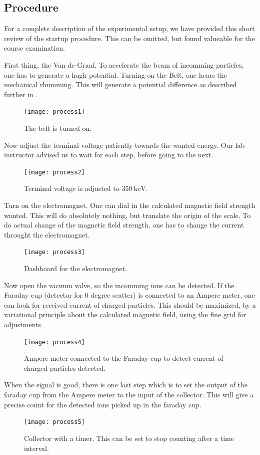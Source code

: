 \clearpage
\subsection{Procedure}
For a complete description of the experimental setup, we have provided this
short review of the startup procedure. This can be omitted, but found valueable
for the course examination.

First thing, the Van-de-Graaf. To accelerate the beam of incomming particles,
one has to generate a hugh potential. Turning on the Belt, one hears the
mechanical rhumming. This will generate a potential difference as described
further in \cite[p. 565]{krane}.
\begin{figure}[h!]
\centering
\texttt{[image: process1]}
\caption{The belt is turned on.}
\label{fig_process1}
\end{figure}

Now adjust the terminal voltage patiently towards the wanted energy. Our lab
instructor advised us to wait for each step, before going to the next.
\begin{figure}[h!]
\centering
\texttt{[image: process2]}
\caption{Terminal voltage is adjusted to $\SI{350}{\kilo\electronvolt}$.}
\label{fig_process2}
\end{figure}

Turn on the electromagnet. One can dial in the calculated magnetic field
strength wanted. This will do absolutely nothing, but translate the origin of
the scale. To do actual change of the magnetic field strength, one has to
change the current throught the electromagnet.
\begin{figure}[h!]
\centering
\texttt{[image: process3]}
\caption{Dashboard for the electromagnet.}
\label{fig_process3}
\end{figure}

Now open the vacuum valve, so the incomming ions can be detected.
If the Faraday cup (detector for $0$ degree scatter) is connected to an Ampere
meter, one can look for received current of charged particles. This should be
maximized, by a variational principle about the calculated magnetic field,
using the fine grid for adjustments.

\begin{figure}[h!]
\centering
\texttt{[image: process4]}
\caption{Ampere meter connected to the Faraday cup to detect current of charged
particles detected.}
\label{fig_process4}
\end{figure}
When the signal is good, there is one last step which is to set the output of
the faraday cup from the Ampere meter to the input of the collector. This will
give a precise count for the detected ions picked up in the faraday cup.
\begin{figure}[b]
\centering
\texttt{[image: process5]}
\caption{Collector with a timer. This can be set to stop counting after a time
interval.}
\label{fig_process5}
\end{figure}







